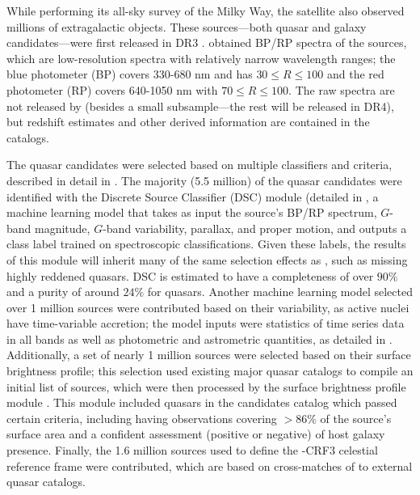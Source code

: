 While performing its all-sky survey of the Milky Way, the \Gaia satellite \citep{gaia_collaboration_gaia_2016} also observed millions of extragalactic objects.
These sources---both quasar and galaxy candidates---were first released in \Gaia DR3 \citep{gaia_collaboration_gaia_2023, gaia_collaboration_gaia_2023-1}.
\Gaia obtained BP/RP spectra of the sources, which are low-resolution spectra with relatively narrow wavelength ranges; the blue photometer (BP) covers 330-680 nm and has $30 \leq R \leq 100$ and the red photometer (RP) covers 640-1050 nm \citep{carrasco_internal_2021} with $70 \leq R \leq 100$.
The raw spectra are not released by \Gaia (besides a small subsample---the rest will be released in \Gaia DR4), but redshift estimates and other derived information are contained in the catalogs.

The quasar candidates were selected based on multiple classifiers and criteria, described in detail in \cite{gaia_collaboration_gaia_2023}.
The majority (5.5 million) of the quasar candidates were identified with the Discrete Source Classifier (DSC) module (detailed in \cite{delchambre_gaia_2023}, a machine learning model that takes as input the source's BP/RP spectrum, $G$-band magnitude, $G$-band variability, parallax, and proper motion, and outputs a class label trained on \SDSS spectroscopic classifications.
Given these \SDSS labels, the results of this module will inherit many of the same selection effects as \SDSS, such as missing highly reddened quasars.
DSC is estimated to have a completeness of over $90\%$ and a purity of around $24\%$ for quasars.
Another machine learning model selected over 1 million sources were contributed based on their variability, as active nuclei have time-variable accretion; the model inputs were statistics of time series data in all \Gaia bands as well as photometric and astrometric quantities, as detailed in \cite{rimoldini_gaia_2023}. 
Additionally, a set of nearly 1 million sources were selected based on their surface brightness profile; this selection used existing major quasar catalogs to compile an initial list of sources, which were then processed by the \Gaia surface brightness profile module \cite{ducourant_gaia_2022}.
This module included quasars in the candidates catalog which passed certain criteria, including having \Gaia observations covering $>86\%$ of the source's surface area and a confident assessment (positive or negative) of host galaxy presence.
Finally, the 1.6 million sources used to define the \Gaia-CRF3 celestial reference frame were contributed, which are based on cross-matches of \Gaia to external quasar catalogs.
